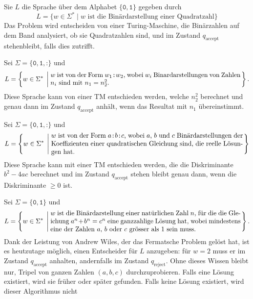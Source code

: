 \begin{loesung}
\begin{teilaufgaben}
\item Sie $L$ die Sprache über dem Alphabet $\{\texttt{0}, \texttt{1}\}$
gegeben durch
\[
L=\{ w\in\Sigma^*\;|\;
\text{$w$ ist die Binärdarstellung einer Quadratzahl}
\}
\]
Das Problem wird entscheiden von einer Turing-Maschine, die Binärzahlen auf
dem Band analysiert, ob sie Quadratzahlen sind, und im Zustand
$q_{\text{accept}}$ stehenbleibt, falls dies zutrifft.
\item
Sei $\Sigma=\{\texttt{0},\texttt{1},\texttt{:}\}$ und
\[
L=\left\{w\in\Sigma^*\;\left|\;
\begin{minipage}{4truein}
$w$ ist von der Form $w_1\texttt{:}w_2$, wobei $w_i$ Binardarstellungen
von Zahlen $n_i$ sind mit $n_1=n_2^2$.
\end{minipage}
\right.\right\}.
\]
Diese Sprache kann von einer TM entschieden werden, welche $n_2^2$ 
berechnet und genau dann im Zustand $q_{\text{accept}}$ anhält, wenn
das Resultat mit $n_1$ übereinstimmt.
\item 
Sei $\Sigma=\{\texttt{0},\texttt{1},\texttt{:}\}$ und 
\[
L=\left\{w\in\Sigma^*\;\left|\;
\begin{minipage}{4truein}
$w$ ist von der Form $a\texttt{:}b\texttt{:}c$, wobei $a$, $b$ und $c$
Binärdarstellungen der Koeffizienten einer quadratischen Gleichung sind,
die reelle Lösungen hat.
\end{minipage}
\right.\right\}
\]
Diese Sprache kann mit einer TM entschieden werden, die die Diskriminante
$b^2-4ac$ berechnet und im Zustand $q_{\text{accept}}$ stehen bleibt genau
dann, wenn die Diskriminante $\ge 0$ ist.
\item 
Sei $\Sigma=\{\texttt{0},\texttt{1}\}$ und
\[
L=\left\{ w\in\Sigma^*\;\left|\;
\begin{minipage}{4truein}
$w$ ist die Binärdarstellung einer natürlichen Zahl $n$, für die
die Gleichung $a^n+b^n=c^n$ eine ganzzahlige Lösung hat, wobei mindestens
eine der Zahlen $a$, $b$ oder $c$ grösser als $1$ sein muss.
\end{minipage}
\right.\right\}.
\]
Dank der Leistung von Andrew Wiles, der das Fermatsche Problem gelöst hat,
ist es heutzutage möglich, einen
Entscheider für $L$ anzugeben: für $w=2$ muss er im Zustand
$q_{\text{accept}}$ anhalten, andernfalls im Zustand $q_{\text{reject}}$.
Ohne dieses Wissen bleibt nur, Tripel von ganzen Zahlen $(a,b,c)$
durchzuprobieren. Falls eine Lösung existiert, wird sie früher oder später
gefunden. Falls keine Lösung existiert, wird dieser Algorithmus nicht

\end{teilaufgaben}
\end{loesung}
